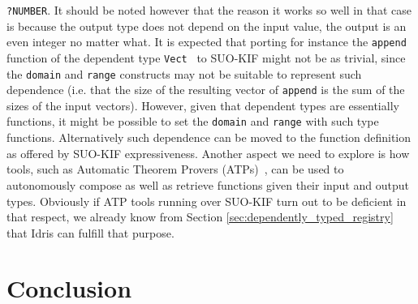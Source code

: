 \documentclass[]{report}
\begin{document}
\begin{itemize}
\texttt{?NUMBER}.  It should be noted however that the reason it works
so well in that case is because the output type does not depend on the
input value, the output is an even integer no matter what.  It is
expected that porting for instance the \texttt{append} function of the
dependent type \texttt{Vect}~\cite{Vectors} to SUO-KIF might not be as
trivial, since the \texttt{domain} and \texttt{range} constructs may
not be suitable to represent such dependence (i.e. that the size of
the resulting vector of \texttt{append} is the sum of the sizes of the
input vectors).  However, given that dependent types are essentially
functions, it might be possible to set the \texttt{domain} and
\texttt{range} with such type functions.  Alternatively such
dependence can be moved to the function definition as offered by
SUO-KIF expressiveness.  Another aspect we need to explore is how
tools, such as Automatic Theorem Provers
(ATPs)~\cite{Baumgartner_automatedreasoning, Urban_anoverview,
  Alvez_evaluating_atp_adimen_SUMO}, can be used to autonomously
compose as well as retrieve functions given their input and output
types.  Obviously if ATP tools running over SUO-KIF turn out to be
deficient in that respect, we already know from Section
\ref{sec:dependently_typed_registry} that Idris can fulfill that
purpose.
\end{itemize}

\chapter{Conclusion}
\end{document}
